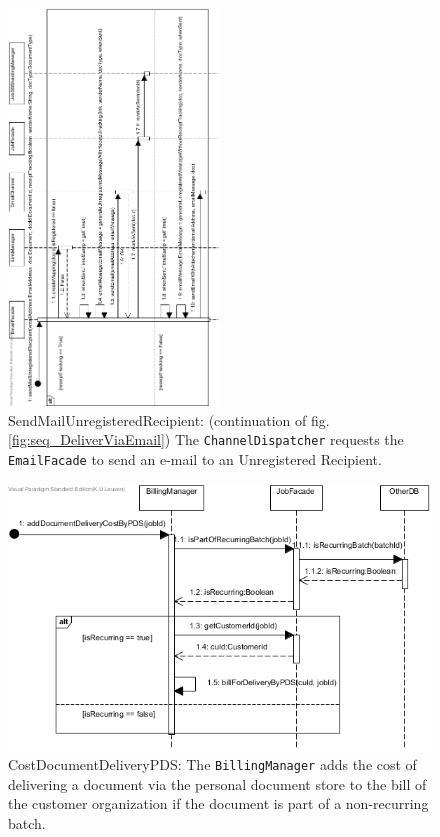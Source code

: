 \documentclass[a4paper,10pt]{article}
\begin{document}
\begin{figure}[!htp]
    \centering
    \includegraphics[width=0.5\textwidth]{SendMailUnregisteredRecipient.png}
    \caption{SendMailUnregisteredRecipient: (continuation of fig. \ref{fig:seq_DeliverViaEmail}) The \texttt{ChannelDispatcher} requests the \texttt{EmailFacade} to send an e-mail to an Unregistered Recipient.
    }\label{fig:seq_SendMailUnregisteredRecipient}
\end{figure}

\begin{figure}[!htp]
    \centering
    \includegraphics[width=\textwidth]{CostDocumentDeliveryPDS.png}
    \caption{CostDocumentDeliveryPDS:  The \texttt{BillingManager} adds the cost of delivering a document via the personal document store to the bill of the customer organization if the document is part of a non-recurring batch.
    }\label{fig:seq_CostDocumentDeliveryPDS}
\end{figure}
\end{document}
